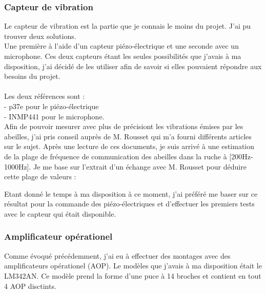 \documentclass[12pt,french,a4paper]{article}
\begin{document}
\subsubsection{Capteur de vibration}
Le capteur de vibration est la partie que je connais le moins du projet. J'ai pu trouver deux solutions.\\
 Une première à l'aide d'un capteur piézo-électrique et une seconde avec un  microphone. Ces deux capteurs étant les seules possibilités que j'avais à ma disposition, 
 j'ai décidé de les utiliser afin de savoir si elles pouvaient répondre aux besoins du projet.\\
\\
 Les deux références sont :\\
- p37e pour le piézo-électrique\\
- INMP441 pour le microphone.\\

Afin de pouvoir mesurer avec plus de précisiont les vibrations émises par les abeilles, j'ai pris conseil auprès de M. Rousset qui m'a fourni différents articles sur le sujet.
Après une lecture de ces documents, je suis arrivé à une estimation de la plage de fréquence de communication des abeilles dans la ruche à [200Hz-1000Hz]. Je me base sur l'extrait d'un échange avec M. Rousset pour déduire cette plage de valeurs : \\ 

Etant donné le temps à ma disposition à ce moment, j'ai préféré me baser sur ce résultat pour la commande des piézo-électriques et d'effectuer les premiers tests avec le capteur qui était disponible. 

\subsubsection{Amplificateur opérationel} 
Comme évoqué précédemment, j'ai eu à effectuer des montages avec des amplificateurs opérationel (AOP). Le modèles que j'avais à ma disposition était le LM342AN. Ce modèle prend la forme d'une puce à 14 broches et contient en tout 4 AOP disctints. 
\end{document}
